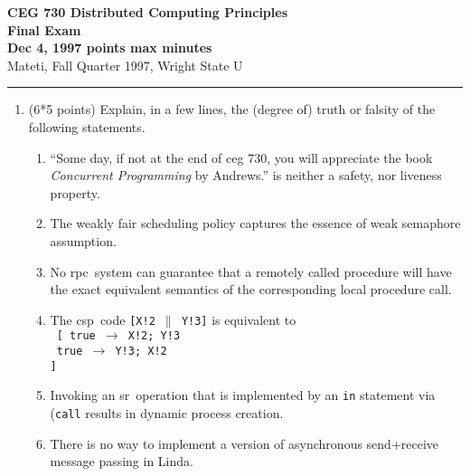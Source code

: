 \def\fat{\framebox[1mm]{\rule{0mm}{2mm}}}
\def\CSP{{\sc csp}}
\def\RPC{{\sc rpc}}
\def\SR{{\sc sr}}
\def\co{{\bf co}}
\def\oc{{\bf oc}}
\def\pa{{$\parallel$}}
\def\lb{\langle}
\def\rb{\rangle}
\def\ra{$\rightarrow$}
\def\await{{\bf await}}
\parindent=0pt
\pagestyle{empty}



{\bf CEG 
\large \bf 730 Distributed Computing Principles\\[5pt]
\large Final Exam\\[10pt]
Dec 4, 1997  points max  minutes\\
}
\bigskip
{Mateti,  Fall Quarter 1997, Wright State U}\\[-5pt]
\hrule

\begin{enumerate}

\item (6*5 points)
Explain, in a few lines, the (degree of) truth or falsity of the
following statements.

\begin{enumerate}

\item
``Some day, if not at the end of {\sc ceg} 730, you will appreciate the
book {\em Concurrent Programming} by Andrews.''  is neither a
safety, nor liveness property.

\item The weakly fair scheduling policy captures the essence
of weak semaphore assumption.

\item No \RPC\ system can guarantee that a remotely called procedure
will have the exact equivalent semantics of the corresponding
local procedure call. 

\item
The \CSP\ code {\tt [X!2 \pa\ Y!3]} is equivalent to \\
{\tt
[  true \ra\ X!2; Y!3\\
\fat\ true \ra\ Y!3; X!2\\
]}

\item
Invoking an \SR\ operation that is implemented by an {\tt in}
statement via ({\tt call} results in dynamic process creation.

\item
There is no way to implement a version of asynchronous send+receive
message passing  in Linda.

\end{enumerate}


\end{enumerate}
